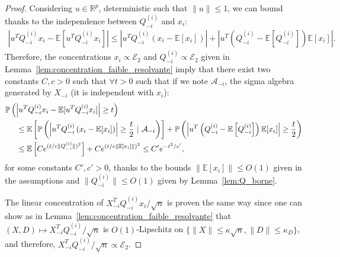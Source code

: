 \documentclass[a4papaer, titlepage]{book}
\begin{document}
 \begin{proof}
   Considering $u\in \mathbb R^p$, deterministic such that $\|u\|\leq 1$, we can bound thanks to the independence between $Q^{(i)}_{-i}$ and $x_i$:
   \begin{align*}
     \left\vert u^TQ^{(i)}_{-i}x_i - \mathbb E[u^TQ^{(i)}_{-i}x_i]\right\vert \leq \left\vert u^TQ^{(i)}_{-i} \left(x_i - \mathbb E[x_i]\right)\right\vert + \left\vert u^T \left(Q^{(i)}_{-i}- \mathbb E[Q^{(i)}_{-i}]\right) \mathbb E[x_i] \right\vert .
   \end{align*}
   Therefore, the concentrations $x_i\propto \mathcal E_2$ and $Q^{(i)}_{-i}\propto \mathcal E_2$ given in Lemma~\ref{lem:concentration_faible_resolvante} imply that there exist two constants $C,c>0$ such that $\forall t>0$ such that if we note $\mathcal A_{-i}$, the sigma algebra generated by $X_{-i}$ (it is independent with $x_i$):
   \begin{align*}
     &\mathbb P \left(\left\vert u^TQ^{(i)}_{-i}x_i - \mathbb E[u^TQ^{(i)}_{-i}x_i]\right\vert \geq t\right) \\
     &\hspace{0.5cm}\leq \mathbb E \left[\mathbb P \left( \left\vert u^TQ^{(i)}_{-i} \left(x_i - \mathbb E[x_i]\right)\right\vert \geq \frac{t}{2} \ | \ \mathcal A_{-i}\right) \right]
     + \mathbb P \left(\left\vert u^T \left(Q^{(i)}_{-i}- \mathbb E \left[Q^{(i)}_{-i}\right]\right) \mathbb E[x_i] \right\vert \geq \frac{t}{2}\right)\\
     &\hspace{0.5cm}\leq \mathbb E \left[Ce^{(t/c\|Q^{(i)}_{-i}\|)^2} \right] + Ce^{(t/c\|\mathbb E[x_i]\|)^2} \leq C' e^{-t^2/c'},
   \end{align*}
   for some constants $C',c' >0$, thanks to the bounds $\|\mathbb E[x_i]\|\leq O(1)$ given in the assumptions and $\|Q^{(i)}_{-i}\| \leq O(1)$ given by Lemma~\ref{lem:Q_borne}.%

   The linear concentration of $X_{-i}^TQ_{-i}^{(i)}x_i/\sqrt n$ is proven the same way since one can show as in Lemma~\ref{lem:concentration_faible_resolvante} that $(X,D) \mapsto X_{-i}^TQ_{-i}^{(i)}/\sqrt n$ is $O(1)$-Lipschitz on $\{\|X\|\leq \kappa\sqrt n, \|D\|\leq \kappa_D\}$, and therefore, $X_{-i}^TQ_{-i}^{(i)}/\sqrt n \propto \mathcal E_2$. 

 \end{proof}
\end{document}
